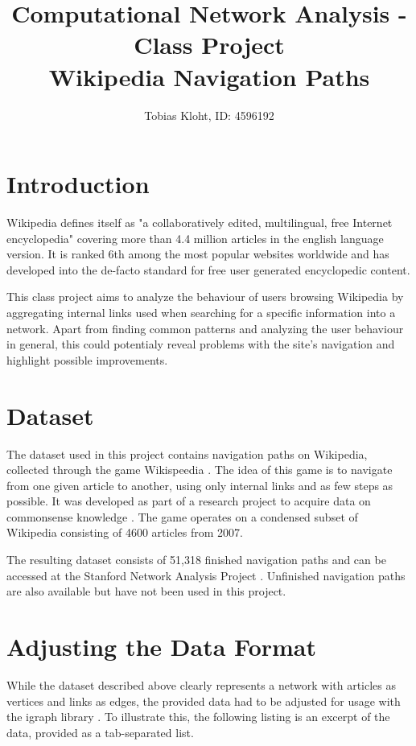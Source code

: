 \documentclass{article}\usepackage[]{graphicx}\usepackage[]{color}
\begin{document}
\title{Computational Network Analysis - Class Project \\ Wikipedia Navigation Paths}
\author{Tobias Kloht, ID: 4596192}
\maketitle
\section{Introduction}
Wikipedia defines itself as "a collaboratively edited, multilingual, free Internet encyclopedia" \cite{wiki:def} covering more than 4.4 million articles in the english language version. It is ranked 6th among the most popular websites worldwide \cite{alexa:wiki} and has developed into the de-facto standard for free user generated encyclopedic content.

This class project aims to analyze the behaviour of users browsing Wikipedia by aggregating internal links used when searching for a specific information into a network. Apart from finding common patterns and analyzing the user behaviour in general, this could potentialy reveal problems with the site's navigation and highlight possible improvements.

\section{Dataset}
The dataset used in this project contains navigation paths on Wikipedia, collected through the game Wikispeedia \cite{wikispeedia}. The idea of this game is to navigate from one given article to another, using only internal links and as few steps as possible. It was developed as part of a research project to acquire data on commonsense knowledge \cite{wikispeedia:article}. The game operates on a condensed subset of Wikipedia consisting of 4600 articles from 2007.

The resulting dataset consists of 51,318 finished navigation paths and can be accessed at the Stanford Network Analysis Project \cite{snap}. Unfinished navigation paths are also available but have not been used in this project.

\section{Adjusting the Data Format}
While the dataset described above clearly represents a network with articles as vertices and links as edges, the provided data had to be adjusted for usage with the igraph library \cite{igraph}. To illustrate this, the following listing is an excerpt of the data, provided as a tab-separated list. 
\end{document}
